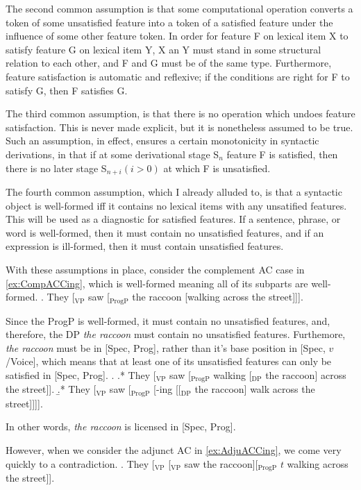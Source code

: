 \documentclass[MilwayThesis]{subfiles}
\begin{document}
The second common assumption is that some computational operation converts a token of some unsatisfied feature into a token of a satisfied feature under the influence of some other feature token.
In order for feature F on lexical item X to satisfy feature G on lexical item Y, X an Y must stand in some structural relation to each other, and F and G must be of the same type.
Furthermore, feature satisfaction is automatic and reflexive; if the conditions are right for F to satisfy G, then F satisfies G.

The third common assumption, is that there is no operation which undoes feature satisfaction.
This is never made explicit, but it is nonetheless assumed to be true.
Such an assumption, in effect, ensures a certain monotonicity in syntactic derivations, in that if at some derivational stage S$_n$ feature F is satisfied, then there is no later stage S$_{n+i} (i > 0)$ at which F is unsatisfied.

The fourth common assumption, which I already alluded to, is that a syntactic object is well-formed iff it contains no lexical items with any unsatified features.
This will be used as a diagnostic for satisfied features.
If a sentence, phrase, or word is well-formed, then it must contain no unsatisfied features, and if an expression is ill-formed, then it must contain unsatisfied features.

With these assumptions in place, consider the complement AC case in \cref{ex:CompACCing}, which is well-formed meaning all of its subparts are well-formed.
\ex. They [$_\text{VP}$ saw [$_\text{ProgP}$ the raccoon [walking across the street]]].\label{ex:CompACCing}

Since the ProgP is well-formed, it must contain no unsatisfied features, and, therefore, the DP \textit{the raccoon} must contain no unsatisfied features.
Furthemore, \textit{the raccoon} must be in [Spec, Prog], rather than it's base position in [Spec, $v$/Voice], which means that at least one of its unsatisfied features can only be satisfied in [Spec, Prog]. 
\ex.
\a.* They [$_\text{VP}$ saw [$_\text{ProgP}$ walking [$_\text{DP}$ the raccoon] across the street]].
\b.* They [$_\text{VP}$ saw [$_\text{ProgP}$ [-ing [[$_\text{DP}$ the raccoon] walk across the street]]]].

In other words, \textit{the raccoon} is licensed in [Spec, Prog].

However, when we consider the adjunct AC in \cref{ex:AdjuACCing}, we come very quickly to a contradiction.
\ex. They [$_\text{VP}$ [$_\text{VP}$ saw the raccoon][$_\text{ProgP}$ $t$ walking across the street]].\label{ex:AdjuACCing}
\end{document}
